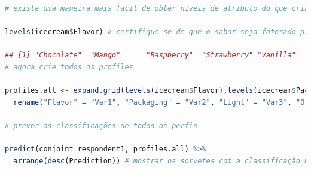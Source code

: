 \documentclass{article}
\begin{document}
\begin{lstlisting}[language=R]
# existe uma maneira mais facil de obter niveis de atributo do que criar os vetores manualmente:

levels(icecream$Flavor) # certifique-se de que o sabor seja fatorado primeiro!

## [1] "Chocolate"  "Mango"      "Raspberry"  "Strawberry" "Vanilla"
# agora crie todos os profiles

profiles.all <- expand.grid(levels(icecream$Flavor),levels(icecream$Packaging),levels(icecream$Light),levels(icecream$Organic)) %>% 
  rename("Flavor" = "Var1", "Packaging" = "Var2", "Light" = "Var3", "Organic" = "Var4") # rename the variables created by expand.grid (don't forget this, otherwise predict won't know where to look for each attribute)

# prever as classificações de todos os perfis

predict(conjoint_respondent1, profiles.all) %>% 
  arrange(desc(Prediction)) # mostrar os sorvetes com a classificação mais alta prevista no topo
  

\end{lstlisting}
\end{document}
